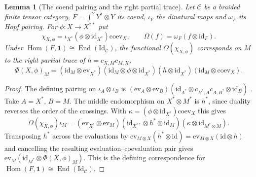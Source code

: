 \documentclass[11pt,reqno]{amsart}
\newtheorem{lemma}[theorem]{Lemma}
\theoremstyle{definition}
\newcommand{\Hom}{\operatorname{Hom}}
\newcommand{\End}{\operatorname{End}}
\newcommand{\one}{\mathbf 1}
\newcommand{\C}{\mathcal C}
\begin{document}
\begin{lemma}[The coend pairing and the right partial trace]\label{lem:coend-trace}
Let $\C$ be a braided finite tensor category, $F=\int^Y Y^*\otimes Y$ its coend, $\iota_Y$ the dinatural maps and $\omega_F$ its Hopf pairing. For $\phi:X\to X^{**}$ put
\[
 \chi_{X,\phi}=\iota_{X^*}(\phi\otimes\mathrm{id}_{X^*})\mathrm{coev}_X,
 \qquad \Omega(f)=\omega_F(f\otimes\mathrm{id}_F).
\]
Under $\Hom(F,\one)\cong\End(\mathrm{Id}_{\C})$, the functional $\Omega(\chi_{X,\phi})$ corresponds on $M$ to the right partial trace of $h=c_{X,M}c_{M,X}$,
\[
 \Phi(X,\phi)_M =
 (\mathrm{id}_M\otimes\mathrm{ev}_{X^*})
 (\mathrm{id}_M\otimes\phi\otimes\mathrm{id}_{X^*})
 (h\otimes\mathrm{id}_{X^*})
 (\mathrm{id}_M\otimes\mathrm{coev}_X).
\]
\end{lemma}
\begin{proof}
The defining pairing on $\iota_A\otimes\iota_B$ is
$(\mathrm{ev}_A\otimes\mathrm{ev}_B)
(\mathrm{id}_{A^*}\otimes c_{B^*,A}c_{A,B^*}\otimes\mathrm{id}_B)$
\cite[(3.4) and (5.1)]{Shimizu}. Take $A=X^*$, $B=M$. The middle endomorphism on $X^*\otimes M^*$ is $h^*$, since duality reverses the order of the crossings. With $\kappa=(\phi\otimes\mathrm{id}_{X^*})\mathrm{coev}_X$ this gives
\[
 \Omega(\chi_{X,\phi})\iota_M=
 (\mathrm{ev}_{X^*}\otimes\mathrm{ev}_M)
 (\mathrm{id}_{X^{**}}\otimes h^*\otimes\mathrm{id}_M)
 (\kappa\otimes\mathrm{id}_{M^*\otimes M}).
\]
Transposing $h^*$ across the evaluations by
$\mathrm{ev}_{M\otimes X}(h^*\otimes\mathrm{id})
=\mathrm{ev}_{M\otimes X}(\mathrm{id}\otimes h)$
and cancelling the resulting evaluation--coevaluation pair gives
$\mathrm{ev}_M(\mathrm{id}_{M^*}\otimes\Phi(X,\phi)_M)$. This is the defining correspondence for $\Hom(F,\one)\cong\End(\mathrm{Id}_{\C})$.
\end{proof}
\end{document}

